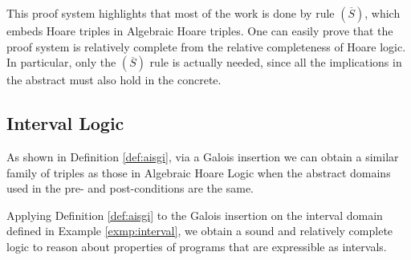 This proof system highlights that most of the work is done by rule
$(\overline{S})$, which embeds Hoare triples in Algebraic Hoare triples. One can
easily prove that the proof system is relatively complete from the relative
completeness of Hoare logic. In particular, only the $(\overline{S})$ rule is
actually needed, since all the implications in the abstract must also hold in
the concrete.

\subsection{Interval Logic} As shown in Definition \ref{def:aisgi}, via a Galois
insertion we can obtain a similar family of triples as those in Algebraic Hoare
Logic when the abstract domains used in the pre- and post-conditions are the
same.

\begin{example}
  \label{exmp:int-logic}
  Applying Definition \ref{def:aisgi} to the Galois insertion on the interval
  domain defined in Example \ref{exmp:interval}, we obtain a sound and
  relatively complete logic to reason about properties of programs that are
  expressible as intervals.
\end{example}


